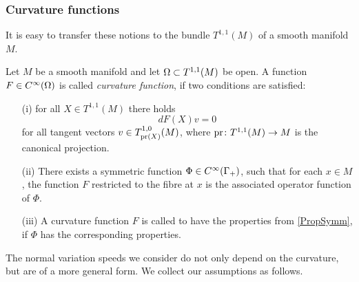 {}

\subsubsection*{Curvature functions}

It is easy to transfer these notions to the bundle $T^{1,1}(M)$ of a smooth manifold $M$.

\begin{defn}
Let $M$ be a smooth manifold and let $\Omega\subset T^{1,1}(M)$ be open. A function $F\in C^{\infty}(\Omega)$ is called {\it{curvature function}}, if two conditions are satisfied: 
\begin{itemize}
\item[(i)] for all $X\in T^{1,1}(M)$ there holds
\[dF(X)v=0\]
for all tangent vectors $v\in T^{1,0}_{\operatorname{pr}(X)}(M)$, where $\operatorname{pr}\colon T^{1,1}(M)\rightarrow M$ is the canonical projection.

\item[(ii)] There exists a symmetric function $\Phi\in C^{\infty}(\Gamma_{+})$, such that for each $x\in M$, the function $F$ restricted to the fibre at $x$ is the associated operator function of $\Phi$.

\item[(iii)] A curvature function $F$ is called to have the properties from \cref{PropSymm}, if $\Phi$ has the corresponding properties. 
\end{itemize}
\end{defn}





The normal variation speeds we consider do not only depend on the curvature, but are of a more general form. We collect our assumptions as follows.

